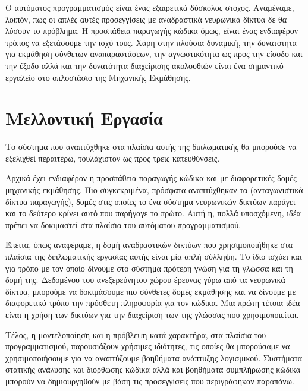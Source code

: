 Ο αυτόματος προγραμματισμός είναι ένας εξαιρετικά δύσκολος στόχος. 
Αναμέναμε, λοιπόν, πως οι απλές αυτές προσεγγίσεις με αναδραστικά νευρωνικά δίκτυα δε θα λύσουν το πρόβλημα.
Η προσπάθεια παραγωγής κώδικα όμως, είναι ένας ενδιαφέρον τρόπος να εξετάσουμε την ισχύ τους. 
Χάρη στην πλούσια δυναμική, την δυνατότητα για εκμάθηση σύνθετων αναπαραστάσεων, την αγνωστικότητα ως προς την είσοδο και την έξοδο αλλά και την δυνατότητα διαχείρισης ακολουθιών είναι ένα σημαντικό εργαλείο στο οπλοστάσιο της Μηχανικής Εκμάθησης. 


\section{Μελλοντική Εργασία}

Το σύστημα που αναπτύχθηκε στα πλαίσια αυτής της διπλωματικής θα μπορούσε να εξελιχθεί περαιτέρω, τουλάχιστον ως προς τρεις κατευθύνσεις.

Αρχικά έχει ενδιαφέρον η προσπάθεια παραγωγής κώδικα και με διαφορετικές δομές μηχανικής εκμάθησης.
Πιο συγκεκριμένα, πρόσφατα αναπτύχθηκαν τα  \cite{} (ανταγωνιστικά δίκτυα παραγωγής), δομές στις οποίες το ένα σύστημα νευρωνικών δικτύων παράγει και το δεύτερο κρίνει αυτό που παρήγαγε το πρώτο.
Αυτή η, πολλά υποσχόμενη, ιδέα πρέπει να δοκιμαστεί στα πλαίσια του αυτόματου προγραμματισμού.

Έπειτα, όπως αναφέραμε, η δομή αναδραστικών δικτύων που χρησιμοποιήθηκε στα πλαίσια της διπλωματικής εργασίας αυτής είναι μία απλή σύλληψη.
Το ίδιο ισχύει και για τρόπο με τον οποίο δίνουμε στο σύστημα πρότερη γνώση για τη γλώσσα και τη δομή της.
Δεδομένου του ανεξερεύνητου χώρου έρευνας γύρω από τα νευρωνικά δίκτυα, μπορούμε να δοκιμάσουμε πιο σύνθετες δομές εκμάθησης και να δίνουμε με διαφορετικό τρόπο την πρόσθετη πληροφορία για τον κώδικα.
Μια πρώτη τέτοια ιδέα είναι η χρήση των \cite{} δικτύων για την διαχείριση των  της γλώσσας που χρησιμοποιείται.

Τέλος, η μοντελοποίηση και η πρόβλεψη κατά χαρακτήρα, στα πλαίσια του προγραμματισμού, παρουσιάζουν χρήσιμες ιδιότητες, τις οποίες θα μπορούσαμε να χρησιμοποιήσουμε για να αναπτύξουμε βοηθήματα ανάπτυξης λογισμικού.
Συστήματα στατικής ανάλυσης και διόρθωσης κώδικα αλλά και βοηθήματα συμπλήρωσης κώδικα μπορούν να δημιουργηθούν με βάση τις προσεγγίσεις που περιγράφηκαν παραπάνω.
